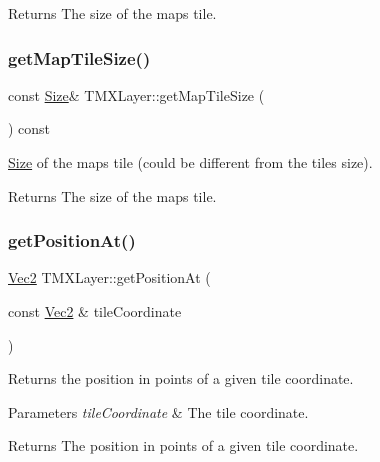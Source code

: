 \begin{DoxyReturn}{Returns}
The size of the map\textquotesingle{}s tile. 
\end{DoxyReturn}
\mbox{\label{classTMXLayer_acb38799b0ca66198f06c9b451b469118}} 
\subsubsection{\texorpdfstring{get\+Map\+Tile\+Size()}{getMapTileSize()}\hspace{0.1cm}{\footnotesize\ttfamily [2/2]}}
{\footnotesize\ttfamily const \hyperlink{classSize}{Size}\& T\+M\+X\+Layer\+::get\+Map\+Tile\+Size (\begin{DoxyParamCaption}{ }\end{DoxyParamCaption}) const\hspace{0.3cm}{\ttfamily [inline]}}

\hyperlink{classSize}{Size} of the map\textquotesingle{}s tile (could be different from the tile\textquotesingle{}s size).

\begin{DoxyReturn}{Returns}
The size of the map\textquotesingle{}s tile. 
\end{DoxyReturn}
\mbox{\label{classTMXLayer_a3b433e1831ed12ae032db0124f286470}} 
\subsubsection{\texorpdfstring{get\+Position\+At()}{getPositionAt()}\hspace{0.1cm}{\footnotesize\ttfamily [1/2]}}
{\footnotesize\ttfamily \hyperlink{classVec2}{Vec2} T\+M\+X\+Layer\+::get\+Position\+At (\begin{DoxyParamCaption}\item[{const \hyperlink{classVec2}{Vec2} \&}]{tile\+Coordinate }\end{DoxyParamCaption})}

Returns the position in points of a given tile coordinate.


\begin{DoxyParams}{Parameters}
{\em tile\+Coordinate} & The tile coordinate. \\
\hline
\end{DoxyParams}
\begin{DoxyReturn}{Returns}
The position in points of a given tile coordinate. 
\end{DoxyReturn}
\mbox{\label{classTMXLayer_a3b433e1831ed12ae032db0124f286470}} 
